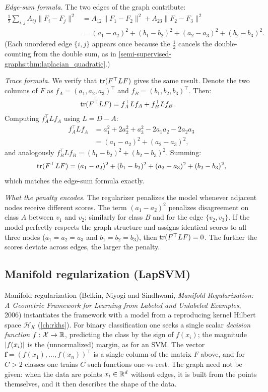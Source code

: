 \begin{notechapter}
\begin{example}
\emph{Edge-sum formula.} The two edges of the graph contribute:
\begin{align*}
\frac{1}{2}\sum_{i,j}A_{ij}\|F_i - F_j\|^2
&= A_{12}\|F_1 - F_2\|^2 + A_{23}\|F_2 - F_3\|^2 \\
&= (a_1 - a_2)^2 + (b_1 - b_2)^2
 + (a_2 - a_3)^2 + (b_2 - b_3)^2.
\end{align*}
(Each unordered edge $\{i,j\}$ appears once because the $\frac{1}{2}$ cancels
the double-counting from the double sum, as in \cref{semi-supervised-graphs:thm:laplacian_quadratic}.)

\emph{Trace formula.} We verify that $\operatorname{tr}(F^\top LF)$ gives the same result.
Denote the two columns of $F$ as $f_A = (a_1, a_2, a_3)^\top$ and
$f_B = (b_1, b_2, b_3)^\top$. Then:
\begin{align*}
\operatorname{tr}(F^\top LF) &= f_A^\top L f_A + f_B^\top L f_B.
\end{align*}
Computing $f_A^\top L f_A$ using $L = D - A$:
\begin{align*}
f_A^\top L f_A
&= a_1^2 + 2a_2^2 + a_3^2 - 2a_1 a_2 - 2a_2 a_3 \\
&= (a_1 - a_2)^2 + (a_2 - a_3)^2,
\end{align*}
and analogously $f_B^\top L f_B = (b_1 - b_2)^2 + (b_2 - b_3)^2$. Summing:
\[
\operatorname{tr}(F^\top LF) = (a_1-a_2)^2 + (b_1-b_2)^2 + (a_2-a_3)^2 + (b_2-b_3)^2,
\]
which matches the edge-sum formula exactly.

\emph{What the penalty encodes.} The regularizer penalizes the model
whenever adjacent nodes receive different scores. The term $(a_1 - a_2)^2$
penalizes disagreement on class $A$ between $v_1$ and $v_2$; similarly for
class $B$ and for the edge $\{v_2, v_3\}$. If the model perfectly respects
the graph structure and assigns identical scores to all three nodes
($a_1 = a_2 = a_3$ and $b_1 = b_2 = b_3$), then $\operatorname{tr}(F^\top LF) = 0$.
The further the scores deviate across edges, the larger the penalty.
\end{example}

\subsection{Manifold regularization (LapSVM)}
\label{semi-supervised-graphs:subsec:manifold_reg}

Manifold regularization (Belkin, Niyogi and Sindhwani, \emph{Manifold Regularization: A Geometric Framework for Learning from Labeled and Unlabeled Examples}, 2006) instantiates the framework with a model from a reproducing kernel Hilbert space $\mathcal H_K$ (\cref{ch:rkhs}). For binary classification one seeks a single scalar \emph{decision function} $f: \mathcal X \to \mathbb{R}$, predicting the class by the sign of $f(x_i)$; the magnitude $\left|f(x_i)\right|$ is the (unnormalized) margin, as for an SVM. The vector $\mathbf f = (f(x_1), \ldots, f(x_n))^\top$ is a single column of the matrix $F$ above, and for $C > 2$ classes one trains $C$ such functions one-vs-rest. The graph need not be given: when the data are points $x_i \in \mathbb{R}^d$ without edges, it is built from the points themselves, and it then describes the shape of the data.


\end{notechapter}
